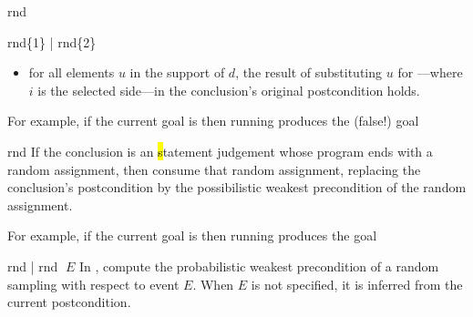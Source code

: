 \begin{tactic}{rnd}
\begin{tsyntax}{rnd\{1\} | rnd\{2\}}
\begin{itemize}
    \item for all elements $u$ in the support of $d$, the result
      of substituting $u$ for ---where $i$ is the
      selected side---in the conclusion's original
      postcondition holds.
    \end{itemize}

    \bigskip For example, if the current goal is
     then
    running 
    produces the (false!) goal
  \end{tsyntax}

  \begin{tsyntax}{rnd}
    If the conclusion is an \hl statement judgement whose program ends
    with a random assignment, then consume that random assignment,
    replacing the conclusion's postcondition by the possibilistic
    weakest precondition of the random assignment.

    \bigskip For example, if the current goal is
     then
    running 
    produces the goal
  \end{tsyntax}

  \begin{tsyntax}{rnd | rnd $\;E$}
    In \phl, compute the probabilistic weakest precondition of a
    random sampling with respect to event $E$. When $E$ is not
    specified, it is inferred from the current postcondition.
  \end{tsyntax}
\end{tactic}

